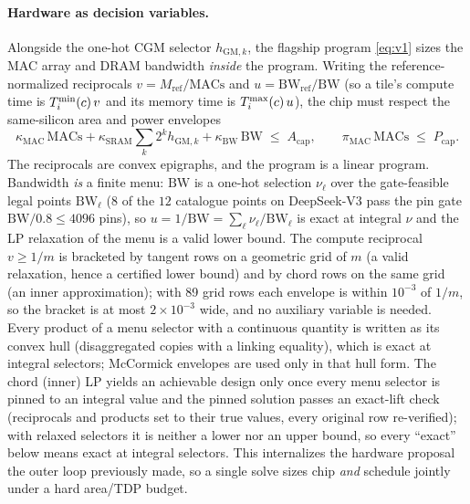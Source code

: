 \paragraph{Hardware as decision variables.}
Alongside the one-hot CGM selector $h_{\mathrm{GM},k}$, the flagship program
\eqref{eq:v1} sizes the MAC array
and DRAM bandwidth \emph{inside} the program. Writing the reference-normalized
reciprocals $v = M_{\mathrm{ref}}/\mathrm{MACs}$ and
$u = \mathrm{BW_{ref}}/\mathrm{BW}$ (so a tile's compute time is $T^{\min}_i(c)\,v$
and its memory time is $T^{\max}_i(c)\,u$), the chip must respect the same-silicon
area and power envelopes
\begin{equation}
\kappa_{\mathrm{MAC}}\,\mathrm{MACs}
 + \kappa_{\mathrm{SRAM}}\!\sum_{k} 2^{k} h_{\mathrm{GM},k}
 + \kappa_{\mathrm{BW}}\,\mathrm{BW} \;\le\; A_{\mathrm{cap}},
\qquad
\pi_{\mathrm{MAC}}\,\mathrm{MACs} \;\le\; P_{\mathrm{cap}} .
\label{eq:v3_caps}
\end{equation}
The reciprocals are convex epigraphs, and the program is a linear program.
Bandwidth \emph{is} a finite menu: $\mathrm{BW}$ is a one-hot selection
$\nu_\ell$ over the gate-feasible legal points $\mathrm{BW}_\ell$
($8$ of the $12$ catalogue points on DeepSeek-V3 pass the pin gate
$\mathrm{BW}/0.8\le 4096$ pins), so
$u=1/\mathrm{BW}=\sum_\ell \nu_\ell/\mathrm{BW}_\ell$ is exact at integral
$\nu$ and the LP relaxation of the menu is a valid lower bound. The compute
reciprocal $v \ge 1/m$ is bracketed by tangent rows on a geometric grid of $m$
(a valid relaxation, hence a certified lower bound) and by chord rows on the
same grid (an inner approximation); with 89 grid rows each envelope is within
$10^{-3}$ of $1/m$, so the bracket is at most $2\times10^{-3}$ wide, and no
auxiliary variable is needed. Every product of a
menu selector with a continuous quantity is written as its convex hull
(disaggregated copies with a linking equality), which is exact at integral
selectors; McCormick envelopes are used only in that hull form. The chord
(inner) LP yields an achievable design only once every menu selector is pinned
to an integral value and the pinned solution passes an exact-lift check
(reciprocals and products set to their true values, every original row
re-verified); with relaxed selectors it is neither a lower nor an upper bound,
so every ``exact'' below means exact at integral selectors. This internalizes the hardware proposal the outer loop previously
made, so a single solve sizes chip \emph{and} schedule jointly under a hard
area/TDP budget.

